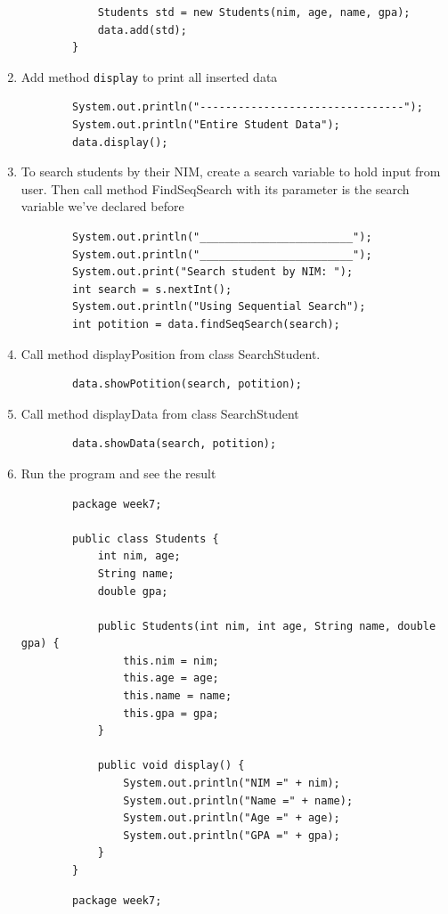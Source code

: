 \documentclass[12pt,titlepage]{article}
\begin{document}
\begin{enumerate}
\begin{verbatim}
            Students std = new Students(nim, age, name, gpa);
            data.add(std);
        }
    \end{verbatim}
    \item Add method \texttt{display} to print all inserted data
    \begin{verbatim}
        System.out.println("--------------------------------");
        System.out.println("Entire Student Data");
        data.display();
    \end{verbatim}
    \item To search students by their NIM, create a search variable to hold input from user. Then call method FindSeqSearch with its parameter is the search variable we’ve declared before
    \begin{verbatim}
        System.out.println("________________________");
        System.out.println("________________________");
        System.out.print("Search student by NIM: ");
        int search = s.nextInt();
        System.out.println("Using Sequential Search");
        int potition = data.findSeqSearch(search);
    \end{verbatim}
    \item Call method displayPosition from class SearchStudent.
    \begin{verbatim}
        data.showPotition(search, potition);
    \end{verbatim} 
    \item Call method displayData from class SearchStudent
    \begin{verbatim}
        data.showData(search, potition);
    \end{verbatim}
    \item Run the program and see the result
    \begin{verbatim}
        package week7;

        public class Students {
            int nim, age;
            String name;
            double gpa;

            public Students(int nim, int age, String name, double gpa) {
                this.nim = nim;
                this.age = age;
                this.name = name;
                this.gpa = gpa;
            }

            public void display() {
                System.out.println("NIM =" + nim);
                System.out.println("Name =" + name);
                System.out.println("Age =" + age);
                System.out.println("GPA =" + gpa);
            }
        }
    \end{verbatim}
    \begin{verbatim}
        package week7;


\end{verbatim}
\end{enumerate}
\end{document}
